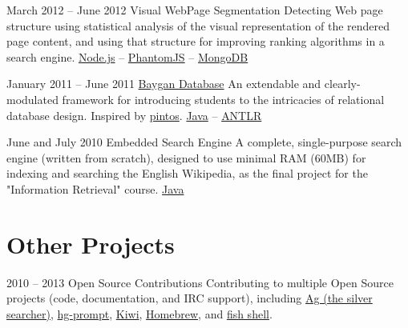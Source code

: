 \documentclass{tccv}
\begin{document}
{{\begin{project_list}
\item{March 2012 -- June 2012}
     {}
     {Visual WebPage Segmentation}
	 {Detecting Web page structure using statistical analysis of the visual representation of the rendered page content, and using that structure for improving ranking algorithms in a search engine.%
}
	 {%
	 	\href{http://nodejs.org}{Node.js} -- 
		\href{http://phantomjs.org}{PhantomJS} -- 
		\href{http://www.mongodb.org}{MongoDB}%
	 }

\vspace{-12pt}

\item{January 2011 -- June 2011}
	 {}
	 {\href{https://github.com/baygan/Baygan}{Baygan Database}}
	 {An extendable and clearly-modulated framework for introducing students to the intricacies of relational database design. Inspired by \href{http://www.stanford.edu/class/cs140/projects/pintos/pintos.html}{pintos}.%
}
	 {%
	 	\href{http://www.oracle.com/technetwork/java/}{Java} -- 
		\href{http://www.antlr.org}{ANTLR}%
	 }

\vspace{-15pt}
	 
\item{June and July 2010}
	 {}
	 {Embedded Search Engine}
	 {A complete, single-purpose search engine (written from scratch), designed to use minimal RAM (60MB) for indexing and searching the English Wikipedia, as the final project for the "Information Retrieval" course.}
	 {%
		 \href{http://www.oracle.com/technetwork/java/}{Java}%
	 }

\end{project_list}



\vspace{-10pt}



\section{Other Projects}

\begin{project_list}
	 
\item{2010 -- 2013}
	 {}
	 {Open Source Contributions}
	 {Contributing to multiple Open Source projects (code, documentation, and IRC support), including 
	 \href{https://github.com/ggreer/the_silver_searcher}{Ag (the silver searcher)}, 
	 \href{http://bitbucket.org/sjl/hg-prompt/}{hg-prompt}, \href{https://github.com/allending/Kiwi}{Kiwi}, 
	 \href{https://github.com/mxcl/homebrew}{Homebrew}, and 
	 \href{http://fishshell.com}{fish shell}.}
	 {}
	 

\end{project_list}}}
\end{document}
